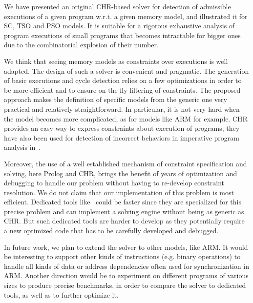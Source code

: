 We have presented an original CHR-based solver for detection of admissible executions of 
a given program w.r.t. a given memory model, and illustrated it for SC, TSO and PSO models.
It is suitable for a rigorous  exhaustive analysis of program executions 
of small programs that becomes intractable for bigger ones due to the combinatorial 
explosion of their number. 

We think that seeing memory models as constraints over executions is
well adapted. 
The design of such a solver is convenient and pragmatic.
The generation of basic executions and cycle detection
relies on
a few optimizations in order to be more efficient and to ensure on-the-fly 
filtering of constraints. The proposed approach makes the definition of specific models from the
generic one very practical and relatively straightforward. In particular, it is  not very hard 
when the model becomes more complicated, as for models like ARM for example.
CHR provides an easy way to express constraints about execution of programs, 
they have also been used for detection of incorrect behaviors in imperative 
program analysis in~\cite{DFPP2014:VPT}.
                         
Moreover, the use of a well established mechanism of constraint specification
and solving, here Prolog and CHR, brings the benefit 
of years of optimization and debugging to handle our problem
without having to re-develop constraint resolution.  We do
not claim that our implementation of this problem is most efficient.
Dedicated tools like~\cite{AMT2014:TPLS} could be faster since they are 
specialized for this precise problem and can implement a solving
engine without being as generic as CHR. %
But such dedicated tools are harder to develop 
as they potentially require  a new optimized code that has to be carefully
developed and debugged.

In future work, we plan to extend the solver to other models, 
like ARM. %
It would be interesting to support other kinds of instructions
(e.g. binary operations) to handle all kinds of data or address
dependencies often used for synchronization in ARM.  Another direction
would be to experiment on different programs of various sizes to
produce precise benchmarks, in order to compare the solver to
dedicated tools, as well as to further optimize it.


